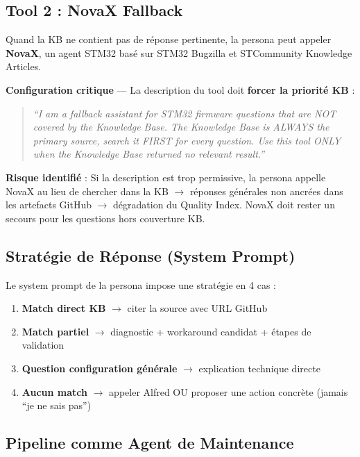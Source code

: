 \documentclass[12pt,a4paper]{report}
\begin{document}
\subsection{Tool 2 : NovaX Fallback}

Quand la KB ne contient pas de réponse pertinente, la persona peut appeler \textbf{NovaX}, un agent STM32 basé sur STM32 Bugzilla et STCommunity Knowledge Articles.

\textbf{Configuration critique} --- La description du tool doit \textbf{forcer la priorité KB} :

\begin{quote}
\textit{``I am a fallback assistant for STM32 firmware questions that are NOT covered by the Knowledge Base. The Knowledge Base is ALWAYS the primary source, search it FIRST for every question. Use this tool ONLY when the Knowledge Base returned no relevant result.''}
\end{quote}

\textbf{Risque identifié} : Si la description est trop permissive, la persona appelle NovaX au lieu de chercher dans la KB $\to$ réponses générales non ancrées dans les artefacts GitHub $\to$ dégradation du Quality Index. NovaX doit rester un secours pour les questions hors couverture KB.

\subsection{Stratégie de Réponse (System Prompt)}

Le system prompt de la persona impose une stratégie en 4 cas :

\begin{enumerate}
  \item \textbf{Match direct KB} $\to$ citer la source avec URL GitHub
  \item \textbf{Match partiel} $\to$ diagnostic + workaround candidat + étapes de validation
  \item \textbf{Question configuration générale} $\to$ explication technique directe
  \item \textbf{Aucun match} $\to$ appeler Alfred OU proposer une action concrète (jamais ``je ne sais pas'')
\end{enumerate}

\subsection{Pipeline comme Agent de Maintenance}
\end{document}
